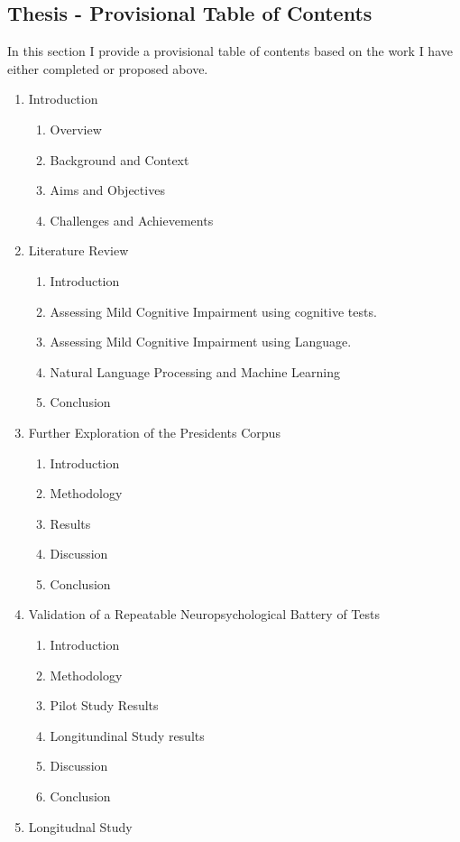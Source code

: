 \documentclass{article}
\begin{document}
\subsection{Thesis - Provisional Table of Contents}
In this section I provide a provisional table of contents based on the work I have either completed or proposed above.
\begin{enumerate}
	\item Introduction
	\begin{enumerate}
		\item Overview
		\item Background and Context
		\item Aims and Objectives
		\item Challenges and Achievements
	\end{enumerate}
	\item Literature Review
	\begin{enumerate}
		\item Introduction
		\item Assessing Mild Cognitive Impairment using cognitive tests.
		\item Assessing Mild Cognitive Impairment using Language.
		\item Natural Language Processing and Machine Learning
		\item Conclusion
	\end{enumerate}
	\item Further Exploration of the Presidents Corpus
	\begin{enumerate}
		\item Introduction
		\item Methodology
		\item Results
		\item Discussion
		\item Conclusion
	\end{enumerate}
	\item Validation of a Repeatable Neuropsychological Battery of Tests
	\begin{enumerate}
		\item Introduction
		\item Methodology
		\item Pilot Study Results
		\item Longitundinal Study results
		\item Discussion
		\item Conclusion
	\end{enumerate}
	\item Longitudnal Study

\end{enumerate}
\end{document}
